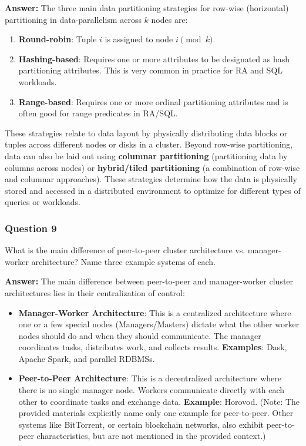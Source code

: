 \documentclass{article}
\begin{document}
\textbf{Answer:}
The three main data partitioning strategies for row-wise (horizontal) partitioning in data-parallelism across $k$ nodes are:
\begin{enumerate}
    \item \textbf{Round-robin}: Tuple $i$ is assigned to node $i \pmod k$.
    \item \textbf{Hashing-based}: Requires one or more attributes to be designated as hash partitioning attributes. This is very common in practice for RA and SQL workloads.
    \item \textbf{Range-based}: Requires one or more ordinal partitioning attributes and is often good for range predicates in RA/SQL.
\end{enumerate}
These strategies relate to data layout by physically distributing data blocks or tuples across different nodes or disks in a cluster. Beyond row-wise partitioning, data can also be laid out using \textbf{columnar partitioning} (partitioning data by columns across nodes) or \textbf{hybrid/tiled partitioning} (a combination of row-wise and columnar approaches). These strategies determine how the data is physically stored and accessed in a distributed environment to optimize for different types of queries or workloads.

\subsubsection*{Question 9}
What is the main difference of peer-to-peer cluster architecture vs. manager-worker architecture? Name three example systems of each. 

\textbf{Answer:}
The main difference between peer-to-peer and manager-worker cluster architectures lies in their centralization of control:
\begin{itemize}
    \item \textbf{Manager-Worker Architecture}: This is a centralized architecture where one or a few special nodes (Managers/Masters) dictate what the other worker nodes should do and when they should communicate. The manager coordinates tasks, distributes work, and collects results.
        \textbf{Examples}: Dask, Apache Spark, and parallel RDBMSs.
    \item \textbf{Peer-to-Peer Architecture}: This is a decentralized architecture where there is no single manager node. Workers communicate directly with each other to coordinate tasks and exchange data.
        \textbf{Example}: Horovod. (Note: The provided materials explicitly name only one example for peer-to-peer. Other systems like BitTorrent, or certain blockchain networks, also exhibit peer-to-peer characteristics, but are not mentioned in the provided context.)
\end{itemize}
\end{document}
